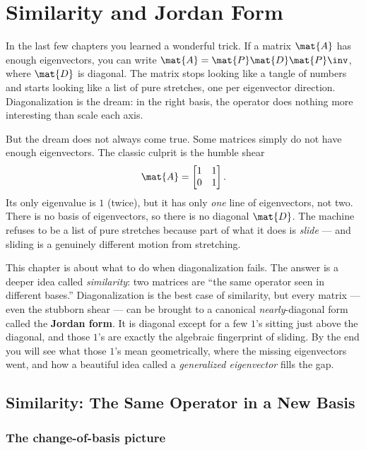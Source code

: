 \chapter{Similarity and Jordan Form}

In the last few chapters you learned a wonderful trick. If a matrix $\mat{A}$ has
enough eigenvectors, you can write $\mat{A} = \mat{P}\mat{D}\mat{P}\inv$, where
$\mat{D}$ is diagonal. The matrix stops looking like a tangle of numbers and starts
looking like a list of pure stretches, one per eigenvector direction. Diagonalization
is the dream: in the right basis, the operator does nothing more interesting than scale
each axis.

But the dream does not always come true. Some matrices simply do not have enough
eigenvectors. The classic culprit is the humble shear
\[
\mat{A} = \begin{bmatrix} 1 & 1 \\ 0 & 1 \end{bmatrix}.
\]
Its only eigenvalue is $1$ (twice), but it has only \emph{one} line of eigenvectors,
not two. There is no basis of eigenvectors, so there is no diagonal $\mat{D}$. The
machine refuses to be a list of pure stretches because part of what it does is
\emph{slide} --- and sliding is a genuinely different motion from stretching.

This chapter is about what to do when diagonalization fails. The answer is a deeper
idea called \emph{similarity}: two matrices are ``the same operator seen in different
bases.'' Diagonalization is the best case of similarity, but every matrix --- even the
stubborn shear --- can be brought to a canonical \emph{nearly}-diagonal form called the
\textbf{Jordan form}. It is diagonal except for a few $1$'s sitting just above the
diagonal, and those $1$'s are exactly the algebraic fingerprint of sliding. By the end
you will see what those $1$'s mean geometrically, where the missing eigenvectors went,
and how a beautiful idea called a \emph{generalized eigenvector} fills the gap.

\section{Similarity: The Same Operator in a New Basis}
\label{ch28:similarity}

\subsection{The change-of-basis picture}

